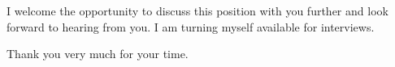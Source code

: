 \documentclass[5pt,stdletter,dateno,sigleft]{newlfm} %
\begin{document}
\begin{newlfm}
I welcome the opportunity to discuss this position with you further and look forward to hearing from you. I am turning myself available for interviews.


Thank you very much for your time.


\end{newlfm}
\end{document}
